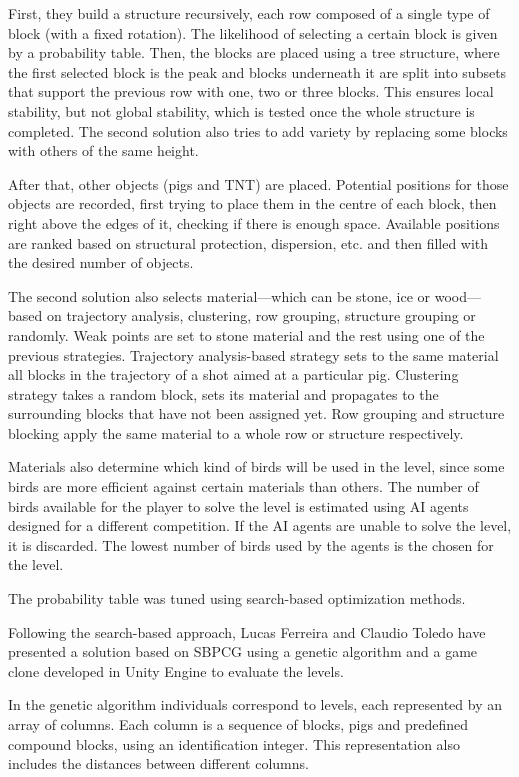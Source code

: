 \documentclass[runningheads,a4paper]{llncs}
\begin{document}
First, they build a structure recursively, each row composed of a single type of block (with a fixed rotation). The likelihood of selecting a certain block is given by a probability table. Then, the blocks are placed using a tree structure, where the first selected block is the peak and blocks underneath it are split into subsets that support the previous row with one, two or three blocks. This ensures local stability, but not global stability, which is tested once the whole structure is completed. The second solution also tries to add variety by replacing some blocks with others of the same height.

After that, other objects (pigs and TNT) are placed. Potential positions for those objects are recorded, first trying to place them in the centre of each block, then right above the edges of it, checking if there is enough space. Available positions are ranked based on structural protection, dispersion, etc. and then filled with the desired number of objects.

The second solution also selects material---which can be stone, ice or wood---based on trajectory analysis, clustering, row grouping, structure grouping or randomly. Weak points are set to stone material and the rest using one of the previous strategies. Trajectory analysis-based strategy sets to the same material all blocks in the trajectory of a shot aimed at a particular pig. Clustering strategy takes a random block, sets its material and propagates to the surrounding blocks that have not been assigned yet. Row grouping and structure blocking apply the same material to a whole row or structure respectively.

Materials also determine which kind of birds will be used in the level, since 
some birds are more efficient against certain materials than others. The number 
of birds available for the player to solve the level is estimated using AI 
agents designed for a different competition. If the AI agents are unable to 
solve the level, it is discarded. The lowest number of birds used by the agents 
is the chosen for the level.

The probability table was tuned using search-based optimization methods.

Following the search-based approach, Lucas Ferreira and Claudio 
Toledo\cite{ferreira2014search} have presented a solution based on SBPCG using 
a genetic algorithm and a game clone developed in Unity Engine to evaluate the 
levels. 

In the genetic algorithm individuals correspond to levels, each represented by 
an array of columns. Each column is a sequence of blocks, pigs and predefined 
compound blocks, using an identification integer. This representation also 
includes the distances between different columns.
\end{document}
